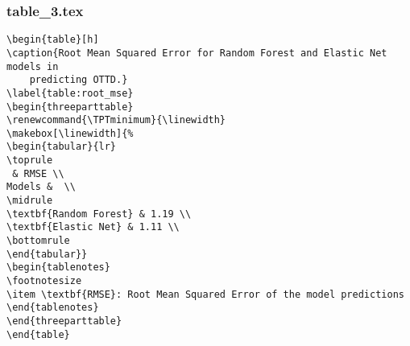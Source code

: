 \documentclass[11pt]{article}
\begin{document}
\subsubsection*{table\_3.tex}

\begin{Verbatim}[tabsize=4]
\begin{table}[h]
\caption{Root Mean Squared Error for Random Forest and Elastic Net models in
	predicting OTTD.}
\label{table:root_mse}
\begin{threeparttable}
\renewcommand{\TPTminimum}{\linewidth}
\makebox[\linewidth]{%
\begin{tabular}{lr}
\toprule
 & RMSE \\
Models &  \\
\midrule
\textbf{Random Forest} & 1.19 \\
\textbf{Elastic Net} & 1.11 \\
\bottomrule
\end{tabular}}
\begin{tablenotes}
\footnotesize
\item \textbf{RMSE}: Root Mean Squared Error of the model predictions
\end{tablenotes}
\end{threeparttable}
\end{table}

\end{Verbatim}
\end{document}
